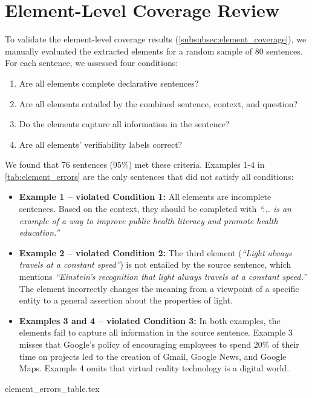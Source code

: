 \section{Element-Level Coverage Review}
\label{app:coverage_review}

To validate the element-level coverage results (\autoref{subsubsec:element_coverage}), we manually evaluated the extracted elements for a random sample of 80 sentences. For each sentence, we assessed four conditions:
\begin{enumerate}
    \item Are all elements complete declarative sentences?
    \item Are all elements entailed by the combined sentence, context, and question?
    \item Do the elements capture all information in the sentence?
    \item Are all elements’ verifiability labels correct?
\end{enumerate}

We found that 76 sentences (95\%) met these criteria. Examples 1-4 in \autoref{tab:element_errors} are the only sentences that did not satisfy all conditions:
\begin{itemize}
    \item \textbf{Example 1 – violated Condition 1:} All elements are incomplete sentences. Based on the context, they should be completed with \textit{``... is an example of a way to improve public health literacy and promote health education.''} 
    \item \textbf{Example 2 – violated Condition 2:} The third element (\textit{``Light always travels at a constant speed''}) is not entailed by the source sentence, which mentions \textit{``Einstein’s recognition that light always travels at a constant speed.''} The element incorrectly changes the meaning from a viewpoint of a specific entity to a general assertion about the properties of light. 
    \item \textbf{Examples 3 and 4 – violated Condition 3:} In both examples, the elements fail to capture all information in the source sentence. Example 3 misses that Google’s policy of encouraging employees to spend 20\% of their time on projects led to the creation of Gmail, Google News, and Google Maps. Example 4 omits that virtual reality technology is a digital world. 
\end{itemize}

{element_errors_table.tex}

